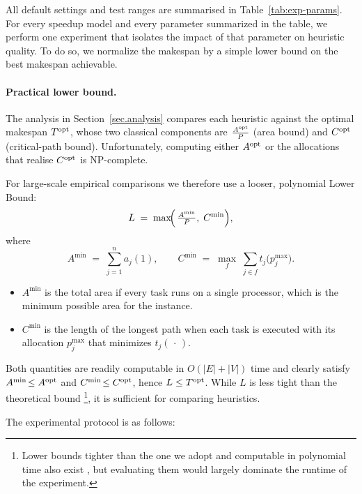 \documentclass{article}
\newcommand\opt{\textnormal{opt}\xspace}
\begin{document}
All default settings and test ranges are summarised in
Table~\ref{tab:exp-params}.
For every speedup model and every parameter summarized in the table, we perform one experiment that isolates the impact
of that parameter on heuristic quality. To do so, we normalize the makespan by a simple lower bound on the best makespan achievable.

\paragraph{Practical lower bound.}
The analysis in Section~\ref{sec.analysis} compares each heuristic against the
optimal makespan \(T^{\opt}\), whose two classical components are
\(\tfrac{A^{\opt}}{P}\) (area bound) and \(C^{\opt}\) (critical-path bound).
Unfortunately, computing either \(A^{\opt}\) or the allocations that realise
\(C^{\opt}\) is NP-complete.%

For large-scale empirical comparisons we therefore use a
looser, polynomial Lower Bound:
\[
L \;=\;
\max\!\Bigl(\,
  \tfrac{A^{\min}}{P},\;
  C^{\min}
\Bigr),
\]
where
\[
A^{\min} \;=\;
\sum_{j=1}^{n} a_j(1),  \qquad
C^{\min} \;=\;
\max_{f}\;
\sum_{j\in f}\!
      t_j\!\bigl(p_j^{\max}\bigr).
\]
\begin{itemize}
  \item \(A^{\min}\) is the total area if every task runs on a single
        processor, which is the minimum possible area for the instance.
  \item \(C^{\min}\) is the length of the longest path when each task is
        executed with its allocation \(p_j^{\max}\) that minimizes
        \(t_j(\,\cdot\,)\).
\end{itemize}
Both quantities are readily computable in \(O(|E|+|V|)\) time and clearly
satisfy \(A^{\min}\!\le A^{\opt}\) and \(C^{\min}\!\le C^{\opt}\), hence
\(L\le T^{\opt}\).  While \(L\) is less tight than the theoretical bound \footnote{%
  Lower bounds tighter than the one we adopt and computable in polynomial time also exist
  \cite{Lepere01_DAG}, but evaluating them would largely dominate the runtime of the experiment.}, it
is sufficient for comparing heuristics.

The experimental protocol is as follows:
\end{document}
